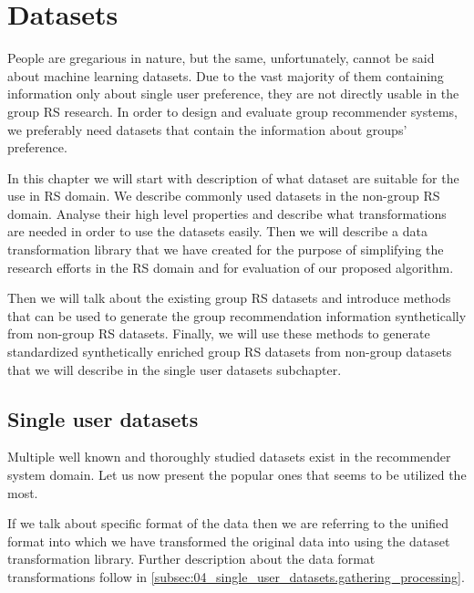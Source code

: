 

\chapter{Datasets}  \label{chap:datasets}
People are gregarious in nature, but the same, unfortunately, cannot be said about machine learning datasets. Due to the vast majority of them containing information only about single user preference, they are not directly usable in the group RS research. In order to design and evaluate group recommender systems, we preferably need datasets that contain the information about groups' preference.

In this chapter we will start with description of what dataset are suitable for the use in RS domain. We describe commonly used datasets in the non-group RS domain. Analyse their high level properties and describe what transformations are needed in order to use the datasets easily. Then we will describe a data transformation library that we have created for the purpose of simplifying the research efforts in the RS domain and for evaluation of our proposed algorithm. 

Then we will talk about the existing group RS datasets and introduce methods that can be used to generate the group recommendation information synthetically from non-group RS datasets. Finally, we will use these methods to generate standardized synthetically enriched group RS datasets from non-group datasets that we will describe in the single user datasets subchapter.


\section{Single user datasets}
Multiple well known and thoroughly studied datasets exist in the recommender system domain. Let us now present the popular ones that seems to be utilized the most.

If we talk about specific format of the data then we are referring to the unified format into which we have transformed the original data into using the dataset transformation library. Further description about the data format transformations follow in \ref{subsec:04_single_user_datasets.gathering_processing}.



